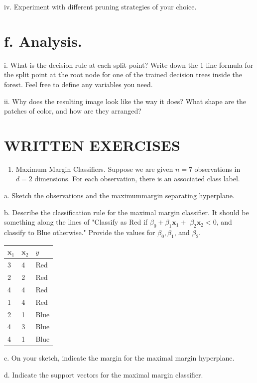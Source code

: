 \documentclass[10pt]{article}
\begin{document}
iv. Experiment with different pruning strategies of your choice.

\section*{f. Analysis.}
i. What is the decision rule at each split point? Write down the 1-line formula for the split point at the root node for one of the trained decision trees inside the forest. Feel free to define any variables you need.

ii. Why does the resulting image look like the way it does? What shape are the patches of color, and how are they arranged?

\section*{WRITTEN EXERCISES}
\begin{enumerate}
  \item Maximum Margin Classifiers. Suppose we are given $n=7$ observations in $d=2$ dimensions. For each observation, there is an associated class label.
\end{enumerate}

a. Sketch the observations and the maximummargin separating hyperplane.

b. Describe the classification rule for the maximal margin classifier. It should be something along the lines of "Classify as Red if $\beta_{0}+\beta_{1} \mathbf{x}_{1}+$ $\beta_{2} \mathbf{x}_{2}<0$, and classify to Blue otherwise." Provide the values for $\beta_{0}, \beta_{1}$, and $\beta_{2}$.

\begin{center}
\begin{tabular}{lll}
$\mathbf{x}_{1}$ & $\mathbf{x}_{2}$ & $y$ \\
\hline
3 & 4 & Red \\
2 & 2 & Red \\
4 & 4 & Red \\
1 & 4 & Red \\
2 & 1 & Blue \\
4 & 3 & Blue \\
4 & 1 & Blue \\
\end{tabular}
\end{center}

c. On your sketch, indicate the margin for the maximal margin hyperplane.

d. Indicate the support vectors for the maximal margin classifier.
\end{document}
